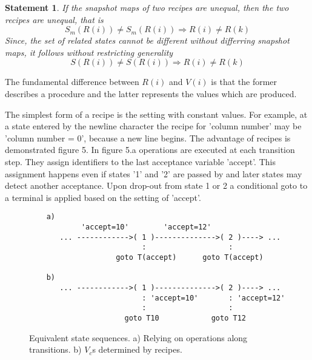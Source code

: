 \documentclass[12pt,a4paper]{scrartcl}
\newtheorem{statement}{Statement}
\begin{document}
\begin{statement}
   If the snapshot maps of two recipes are unequal, then the two recipes
   are unequal, that is
   \begin{equation} \label{eq:snapshot-map-difference}
       S_m(R(i)) \neq S_m(R(i)) \Rightarrow R(i) \neq R(k)
   \end{equation}
   Since, the set of related states cannot be different without differring 
   snapshot maps, it follows without restricting generality
   \begin{equation} \label{eq:snapshot-map-difference2}
       S(R(i)) \neq S(R(i)) \Rightarrow R(i) \neq R(k)
   \end{equation}
\end{statement}

The fundamental difference between $R(i)$ and $V(i)$ is that the former describes
a procedure and the latter represents the values which are produced.

The simplest form of a recipe is the setting with constant values.  For
example, at a state entered by the newline character the recipe for 'column
number' may be 'column number = 0', because a new line begins. The advantage of
recipes is demonstrated figure 5.  In figure 5.a operations are executed at
each transition step. They assign identifiers to the last acceptance variable
'accept'. This assignment happens even if states '1' and '2' are passed by and
later states may detect another acceptance. Upon drop-out from state 1 or 2 a
conditional goto to a terminal is applied based on the setting of 'accept'. 

\begin{figure}[htbp] \leavevmode
\begin{verbatim}
    a)        
            'accept=10'        'accept=12'        
       ... ------------>( 1 )-------------->( 2 )----> ...
                          :                   :
                    goto T(accept)      goto T(accept)

    b) 
       ... ------------>( 1 )-------------->( 2 )----> ...
                          : 'accept=10'       : 'accept=12'              
                          :                   :
                      goto T10            goto T12

\end{verbatim}
\caption{Equivalent state sequences. a) Relying on operations along
transitions. b) $V_c$s determined by recipes.}
\end{figure}
\end{document}
